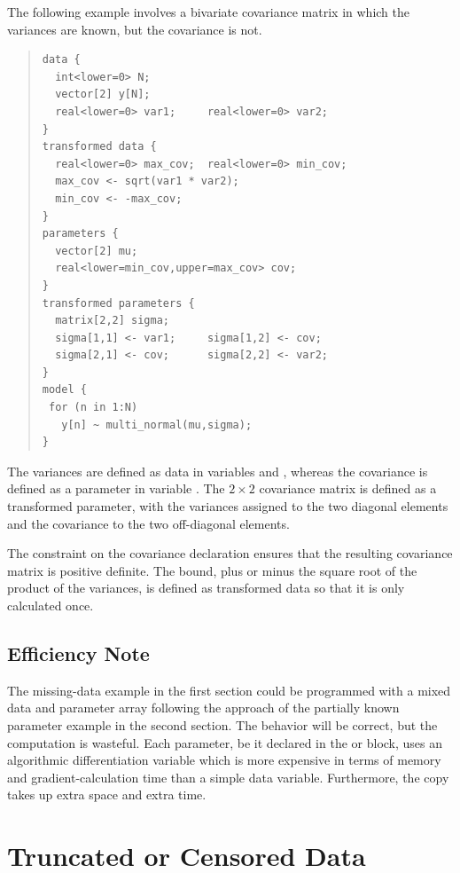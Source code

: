 The following example involves a bivariate covariance matrix in which the
variances are known, but the covariance is not.
%
\begin{quote}
\begin{Verbatim}
data {
  int<lower=0> N;
  vector[2] y[N];
  real<lower=0> var1;     real<lower=0> var2;
}
transformed data {
  real<lower=0> max_cov;  real<lower=0> min_cov;   
  max_cov <- sqrt(var1 * var2);  
  min_cov <- -max_cov;
}
parameters {
  vector[2] mu;
  real<lower=min_cov,upper=max_cov> cov;
}
transformed parameters {
  matrix[2,2] sigma;
  sigma[1,1] <- var1;     sigma[1,2] <- cov;
  sigma[2,1] <- cov;      sigma[2,2] <- var2;
}  
model {
 for (n in 1:N)
   y[n] ~ multi_normal(mu,sigma);
}
\end{Verbatim}
\end{quote}
%
The variances are defined as data in variables  and
, whereas the covariance is defined as a parameter in
variable .  The $2 \times 2$ covariance matrix
 is defined as a transformed parameter, with the variances
assigned to the two diagonal elements and the covariance to the two
off-diagonal elements.

The constraint on the covariance declaration ensures that the
resulting covariance matrix  is positive definite.  The
bound, plus or minus the square root of the product of the variances,
is defined as transformed data so that it is only calculated once.

\section{Efficiency Note}

The missing-data example in the first section could be programmed with
a mixed data and parameter array following the approach of the
partially known parameter example in the second section.  The behavior
will be correct, but the computation is wasteful.  Each parameter, be
it declared in the  or 
block, uses an algorithmic differentiation variable which is more
expensive in terms of memory and gradient-calculation time than a
simple data variable.  Furthermore, the copy takes up extra space and
extra time.


\chapter{Truncated or Censored Data}

